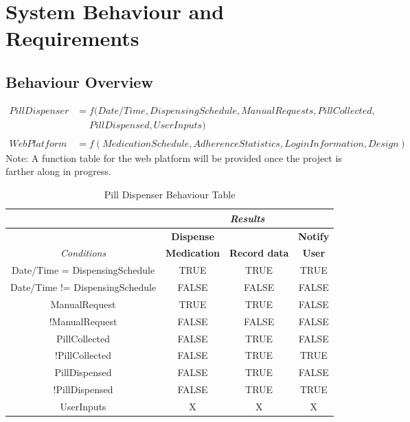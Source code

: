 \documentclass[12pt,titlepage]{article}
\begin{document}
\section{System Behaviour and Requirements}
\subsection{Behaviour Overview}
\vspace{-.5cm}
\begin{align*}
    PillDispenser &= f(Date/Time, DispensingSchedule, ManualRequests, Pill Collected, \\ & \ \ \ \ \ \ Pill Dispensed, UserInputs) \\ \\
    WebPlatform &= f(MedicationSchedule, AdherenceStatistics, LoginInformation, Design) %
\end{align*}
Note: A function table for the web platform will be provided once the project is farther along in progress. 

\begin{table}[ht!]
\begin{center}
\begin{adjustbox}{max width=\textwidth}
\small
\begin{tabular}{| c | c | c | c |}
\hline
  & \multicolumn{3}{c|}{\textit{Results}}\\
 \hline 
  & \textbf{Dispense} & \textbf{} & \textbf{Notify}\\
 \textit{Conditions} & \textbf{Medication} & \textbf{Record data} & \textbf{User}\\
 \hline 
 Date/Time = DispensingSchedule & TRUE & TRUE & TRUE\\
 \hline
  Date/Time != DispensingSchedule & FALSE & FALSE & FALSE\\
 \hline
  ManualRequest & TRUE & TRUE & FALSE\\
 \hline
  !ManualRequest & FALSE & FALSE & FALSE\\
  \hline
   PillCollected & FALSE & TRUE & FALSE\\
 \hline
  !PillCollected & FALSE & TRUE & TRUE\\
 \hline
 PillDispensed & FALSE & TRUE & FALSE\\
 \hline
 !PillDispensed & FALSE & TRUE & TRUE\\
 \hline
  UserInputs & X & X & X\\
 \hline
\end{tabular}
\end{adjustbox}
\end{center}
\caption{Pill Dispenser Behaviour Table}
\end{table}
\end{document}
